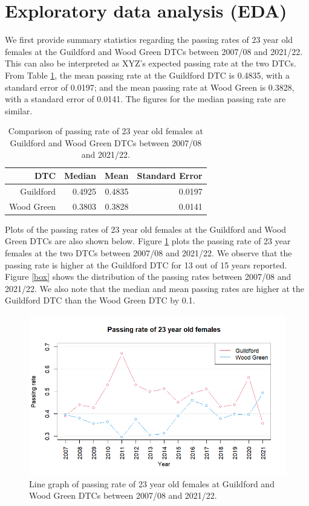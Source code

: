 \documentclass{article}
\begin{document}
\section*{Exploratory data analysis (EDA)}
We first provide summary statistics regarding the passing rates of 23 year old females at the Guildford and Wood Green DTCs between 2007/08 and 2021/22. This can also be interpreted as XYZ's expected passing rate at the two DTCs. From Table \ref{table}, the mean passing rate at the Guildford DTC is 0.4835, with a standard error of 0.0197; and the mean passing rate at Wood Green is 0.3828, with a standard error of 0.0141. The figures for the median passing rate are similar. 

\begin{table}[ht]
\centering
\begin{tabular}{r r r r}
  \hline
DTC & Median & Mean & Standard Error \\ 
  \hline
  Guildford & 0.4925 & 0.4835 & 0.0197 \\
  Wood Green & 0.3803 & 0.3828 & 0.0141 \\
   \hline
\end{tabular}
\caption{Comparison of passing rate of 23 year old females at Guildford and Wood Green DTCs between 2007/08 and 2021/22.}
\label{table}
\end{table}

Plots of the passing rates of 23 year old females at the Guildford and Wood Green DTCs are also shown below. Figure \ref{line} plots the passing rate of 23 year females at the two DTCs between 2007/08 and 2021/22. We observe that the passing rate is higher at the Guildford DTC for 13 out of 15 years reported. Figure \ref{box} shows the distribution of the passing rates between 2007/08 and 2021/22. We also note that the median and mean passing rates are higher at the Guildford DTC than the Wood Green DTC by 0.1.

\begin{figure}[ht!]
\centering
\includegraphics[width=\linewidth]{figures/line.png}
\caption{Line graph of passing rate of 23 year old females at Guildford and Wood Green DTCs between 2007/08 and 2021/22.}
\label{line}
\end{figure}
\end{document}
